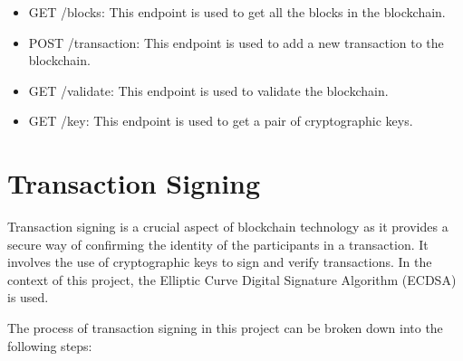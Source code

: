\documentclass{article}
\begin{document}
\begin{itemize}
\item GET /blocks: This endpoint is used to get all the blocks in the blockchain.
\item POST /transaction: This endpoint is used to add a new transaction to the blockchain.
\item GET /validate: This endpoint is used to validate the blockchain.
\item GET /key: This endpoint is used to get a pair of cryptographic keys.
\end{itemize}

\section{Transaction Signing}
Transaction signing is a crucial aspect of blockchain technology as it provides a secure way of confirming the identity of the participants in a transaction. It involves the use of cryptographic keys to sign and verify transactions. In the context of this project, the Elliptic Curve Digital Signature Algorithm (ECDSA) is used.

The process of transaction signing in this project can be broken down into the following steps:
\end{document}
